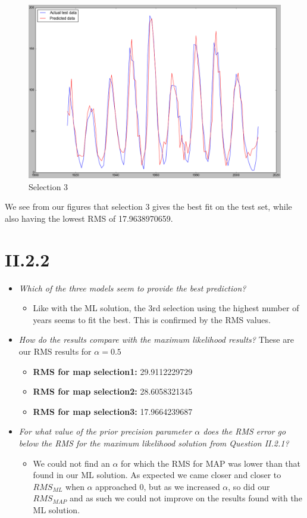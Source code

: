 \documentclass[12pt, a4paper]{article}
\begin{document}
\begin{figure}[H]
	\includegraphics[scale=0.5]{ml_selection_3.png}
	\caption{Selection 3}
\end{figure}

We see from our figures that selection 3 gives the best fit on the test set, while also having the lowest RMS of 17.9638970659.

\section{II.2.2}
\begin{itemize}
\item \textit{Which of the three models seem to provide
the best prediction?}
	\begin{itemize}
		\item Like with the ML solution, the 3rd selection using the highest number of years seems to fit the best. This is confirmed by the RMS values.
	\end{itemize}
\item \textit{How do the results compare with the maximum likelihood
results?}
	These are our RMS results for $\alpha = 0.5$
	\begin{itemize}
		\item \textbf{RMS for map selection1:} 29.9112229729
		\item \textbf{RMS for map selection2:} 28.6058321345
		\item \textbf{RMS for map selection3:} 17.9664239687
	\end{itemize}
\item \textit{For what value of the prior precision parameter $\alpha$ does the RMS error go below the RMS for the maximum likelihood solution from Question II.2.1?}
	\begin{itemize}
		\item We could not find an $\alpha$ for which the RMS for MAP was lower than that found in our ML solution. As expected we came closer and closer to $RMS_{ML}$ when $\alpha$ approached 0, but as we increased $\alpha$, so did our $RMS_{MAP}$ and as such we could not improve on the results found with the ML solution.
	\end{itemize}
\end{itemize}
\end{document}
